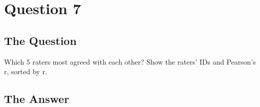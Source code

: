 \section{Question 7}

\subsection{The Question}

\begin{flushleft}

Which 5 raters most agreed with each other? Show the raters'
IDs and Pearson's r, sorted by r.


\end{flushleft}
\subsection{The Answer}


